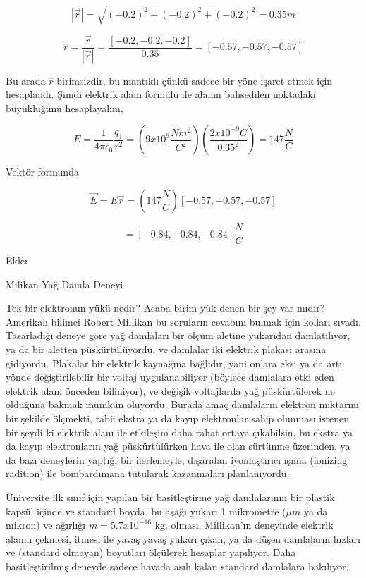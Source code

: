 \documentclass[12pt,fleqn]{article}\usepackage{../../common}
\begin{document}
$$ |\vec{r}| = \sqrt{(-0.2)^2 + (-0.2)^2 + (-0.2)^2 } = 0.35 m$$

$$
\hat{r} = \frac{\vec{r}}{|\vec{r}|} = \frac{[-0.2, -0.2, -0.2]}{0.35} =
[-0.57, -0.57, -0.57]
$$

Bu arada $\hat{r}$ birimsizdir, bu mantıklı çünkü sadece bir yöne işaret
etmek için hesaplandı. Şimdi elektrik alanı formülü ile alanın bahsedilen
noktadaki büyüklüğünü hesaplayalım,

$$ E = \frac{1}{4\pi \epsilon_0} \frac{q_1}{r^2} =
\left( 9 x 10^{9} \frac{Nm^2}{C^2} \right)
\left(\frac{2 x 10^{-9} C}{0.35^2} \right) = 147 \frac{N}{C}
$$

Vektör formunda

$$ \vec{E} = E \vec{r} = \left( 147 \frac{N}{C} \right) [-0.57, -0.57, -0.57] $$

$$ = [-0.84, -0.84, -0.84] \frac{N}{C}$$

Ekler

Milikan Yağ Damla Deneyi

Tek bir elektronun yükü nedir? Acaba birim yük denen bir şey var mıdır?
Amerikalı bilimci Robert Millikan bu soruların cevabını bulmak için kolları
sıvadı. Tasarladığı deneye göre yağ damlaları bir ölçüm aletine yukarıdan
damlatılıyor, ya da bir aletten püskürtülüyordu, ve damlalar iki elektrik
plakası arasına gidiyordu. Plakalar bir elektrik kaynağına bağlıdır, yani
onlara eksi ya da artı yönde değiştirilebilir bir voltaj uygulanabiliyor
(böylece damlalara etki eden elektrik alanı önceden biliniyor), ve değişik
voltajlarda yağ püskürtülerek ne olduğuna bakmak mümkün oluyordu. Burada
amaç damlaların elektron miktarını bir şekilde ölçmekti, tabii ekstra ya da
kayıp elektronlar sahip olunması istenen bir şeydi ki elektrik alanı ile
etkileşim daha rahat ortaya çıkabilsin, bu ekstra ya da kayıp elektronların
yağ püskürtülürken hava ile olan sürtünme üzerinden, ya da bazı deneylerin
yaptığı bir ilerlemeyle, dışarıdan iyonlaştırıcı ışıma (ionizing radition)
ile bombardımana tutularak kazanmaları planlanıyordu.

Üniversite ilk sınıf için yapılan bir basitleştirme yağ damlalarının bir
plastik kapsül içinde ve standard boyda, bu aşağı yukarı 1 mikrometre
($\mu m$ ya da mikron) ve ağırlığı $m = 5.7 x 10^{-16}$ kg.
olması. Millikan'ın deneyinde elektrik alanın çekmesi, itmesi ile yavaş
yavaş yukarı çıkan, ya da düşen damlaların hızları ve (standard olmayan)
boyutları ölçülerek hesaplar yapılıyor. Daha basitleştirilmiş deneyde
sadece havada asılı kalan standard damlalara bakılıyor.
\end{document}
